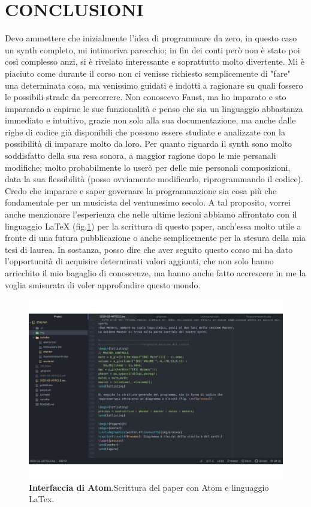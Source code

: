 \documentclass[
	a4paper,
	twocolumn
	]{article}
\begin{document}
\section*{CONCLUSIONI}
Devo ammettere che inizialmente l'idea di programmare da zero,
in questo caso un synth completo, mi intimoriva parecchio; in fin dei conti
però non è stato poi così complesso anzi, si è rivelato interessante e soprattutto
molto divertente. Mi è piaciuto come durante il corso non ci venisse richiesto semplicemente
di "fare" una determinata cosa, ma venissimo guidati e indotti a ragionare su quali
fossero le possibili strade da percorrere. Non conoscevo Faust, ma ho imparato e sto imparando a
capirne le sue funzionalità e penso che sia un linguaggio abbastanza immediato e intuitivo,
grazie non solo alla sua documentazione, ma anche dalle righe di codice già disponibili che
possono essere studiate e analizzate con la possibilità di imparare molto da loro. Per quanto riguarda il synth
sono molto soddisfatto della sua resa sonora, a maggior ragione dopo le mie persanali modifiche; molto
probabilmente lo userò per delle mie personali composizioni, data la sua flessibilità
(posso ovviamente modificarlo, riprogrammando il codice). Credo che imparare e saper
governare la programmazione sia cosa più che fondamentale per un musicista del ventunesimo secolo.
A tal proposito, vorrei anche menzionare l'esperienza che nelle ultime lezioni abbiamo
affrontato con il linguaggio LaTeX (fig.\ref{latex}) per la scrittura di questo paper, anch'essa molto utile a fronte
di una futura pubblicazione o anche semplicemente per la stesura
della mia tesi di laurea. In sostanza, posso dire che aver seguito questo corso mi ha dato l'opportunità di
acquisire determinati valori aggiunti, che non solo hanno arricchito il mio bagaglio di conoscenze,
ma hanno anche fatto accrescere in me la voglia smisurata di voler approfondire questo mondo.

\begin{figure}[h]
\begin{center}
\includegraphics[width=.47\textwidth]{img/latex}
\caption{\textbf{Interfaccia di Atom}.Scrittura del paper con Atom e linguaggio LaTex.}
\label{latex}
\end{center}
\end{figure}
\end{document}

